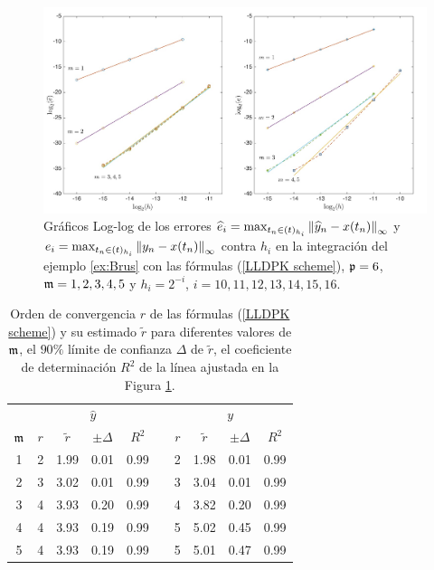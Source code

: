 \begin{figure}[htb]
	\begin{center}
		\includegraphics[scale=0.45]{Graphics/lldp/m-plots.jpg}
		\caption{Gráficos Log-log de los errores $\widehat{e}_i=\max_{t_n\in(t)_{h_i}}\left\lVert \widehat{y}_n-x(t_n) \right\rVert_\infty$ y $e_i=\max_{t_n\in(t)_{h_i}}\left\lVert y_n-x(t_n) \right\rVert_\infty$ contra $h_i$ en la integración del ejemplo \ref{ex:Brus} con las fórmulas (\ref{LLDPK scheme}), $\mathfrak{p}=6$, $\mathfrak{m}=1,2,3,4,5$ y $h_i=2^{-i}$, $i=10,11,12,13,14,15,16$.}
		\label{fig:num-exp-lldp-fix-step:Fig3}
	\end{center}
\end{figure}

\begin{table}[htb]
	\centering
	\caption{
        Orden de convergencia $r$ de las fórmulas (\ref{LLDPK scheme}) y su estimado  $\widetilde{r}$ para diferentes valores de $\mathfrak{m}$, el $90\%$ límite de confianza $\Delta$ de $\widetilde {r}$, el coeficiente de determinación $R^2$ de la línea ajustada en la Figura \ref{fig:num-exp-lldp-fix-step:Fig3}.}
		\begin{tabular}{ c  c c c c  c  c c c c}
			\hline
			& \multicolumn{4}{c}{$\widehat{y}$} & & \multicolumn{4}{c}{$y$} \\
			\cline{2-5} \cline{7-10}
			$\mathfrak{m}$ & $r$ & $\widetilde{r}$ & $\pm\varDelta$ & $R^2$ & & $r$ & $\widetilde{r}$ & $\pm\varDelta$ & $R^2$ \\
			\hline
			1 & 2 & 1.99 & 0.01 & 0.99 & & 2 & 1.98 & 0.01 & 0.99 \\
			2 & 3 & 3.02 & 0.01 & 0.99 & & 3 & 3.04 & 0.01 & 0.99 \\
			3 & 4 & 3.93 & 0.20 & 0.99 & & 4 & 3.82 & 0.20 & 0.99 \\
			4 & 4 & 3.93 & 0.19 & 0.99 & & 5 & 5.02 & 0.45 & 0.99 \\
			5 & 4 & 3.93 & 0.19 & 0.99 & & 5 & 5.01 & 0.47 & 0.99 \\
			\hline
		\end{tabular}
	\label{tab:num-exp-lldp-fix-step:morders}
\end{table}

